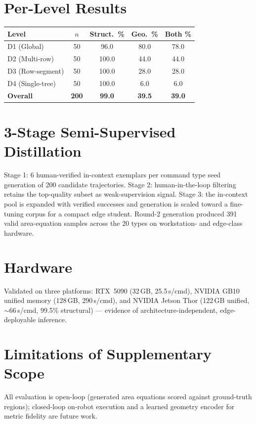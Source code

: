 \documentclass{article}
\begin{document}
\section{Per-Level Results}
\begin{table}[h]\centering\small
\begin{tabular}{lcccc}\toprule
Level & $n$ & Struct.\ \% & Geo.\ \% & Both \% \\ \midrule
D1 (Global) & 50 & 96.0 & 80.0 & 78.0 \\
D2 (Multi-row) & 50 & 100.0 & 44.0 & 44.0 \\
D3 (Row-segment) & 50 & 100.0 & 28.0 & 28.0 \\
D4 (Single-tree) & 50 & 100.0 & 6.0 & 6.0 \\ \midrule
\textbf{Overall} & \textbf{200} & \textbf{99.0} & \textbf{39.5} & \textbf{39.0} \\ \bottomrule
\end{tabular}\end{table}

\section{3-Stage Semi-Supervised Distillation}
Stage 1: 6 human-verified in-context exemplars per command type seed generation of 200 candidate trajectories. Stage 2: human-in-the-loop filtering retains the top-quality subset as weak-supervision signal. Stage 3: the in-context pool is expanded with verified successes and generation is scaled toward a fine-tuning corpus for a compact edge student. Round-2 generation produced 391 valid area-equation samples across the 20 types on workstation- and edge-class hardware.

\section{Hardware}
Validated on three platforms: RTX~5090 (32\,GB, 25.5\,s/cmd), NVIDIA GB10 unified memory (128\,GB, 290\,s/cmd), and NVIDIA Jetson Thor (122\,GB unified, $\sim$66\,s/cmd, 99.5\% structural) --- evidence of architecture-independent, edge-deployable inference.

\section{Limitations of Supplementary Scope}
All evaluation is open-loop (generated area equations scored against ground-truth regions); closed-loop on-robot execution and a learned geometry encoder for metric fidelity are future work.
\end{document}
